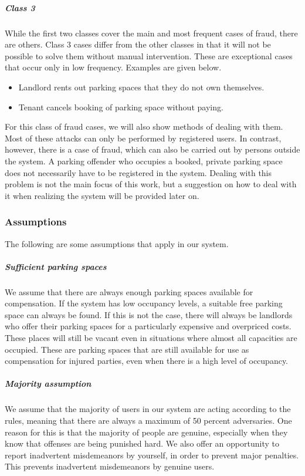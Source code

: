 \documentclass[
a4paper,     %
titlepage,   %
14pt         %
]{scrartcl}  %
\theoremstyle{mystyle}
\begin{document}
\subparagraph{Class 3} While the first two classes cover the main and most frequent cases of fraud, there are others. Class 3 cases differ from the other classes in that it will not be possible to solve them without manual intervention. These are exceptional cases that occur only in low frequency. Examples are given below.
\begin{itemize}
\item Landlord rents out parking spaces that they do not own themselves.
\item Tenant cancels booking of parking space without paying.
\end{itemize}
For this class of fraud cases, we will also show methods of dealing with them.\\

Most of these attacks can only be performed by registered users. In contrast, however, there is a case of fraud, which can also be carried out by persons outside the system. A parking offender who occupies a booked, private parking space does not necessarily have to be registered in the system. Dealing with this problem is not the main focus of this work, but a suggestion on how to deal with it when realizing the system will be provided later on.

\subsubsection{Assumptions}
The following are some assumptions that apply in our system.\\

\subparagraph{Sufficient parking spaces} We assume that there are always enough parking spaces available for compensation. If the system has low occupancy levels, a suitable free parking space can always be found. If this is not the case, there will always be landlords  who offer their parking spaces for a particularly expensive and overpriced costs. These places will still be vacant even in situations where almost all capacities are occupied. These are parking spaces that are still available for use as compensation for injured parties, even when there is a high level of occupancy. 

\subparagraph{Majority assumption} We assume that the majority of users in our system are acting according to the rules, meaning that there are always a maximum of 50 percent adversaries. One reason for this is that the majority of people are genuine, especially when they know that offenses are being punished hard. We also offer an opportunity to report inadvertent misdemeanors by yourself, in order to prevent major penalties. This prevents inadvertent misdemeanors by genuine users.\\
\end{document}
